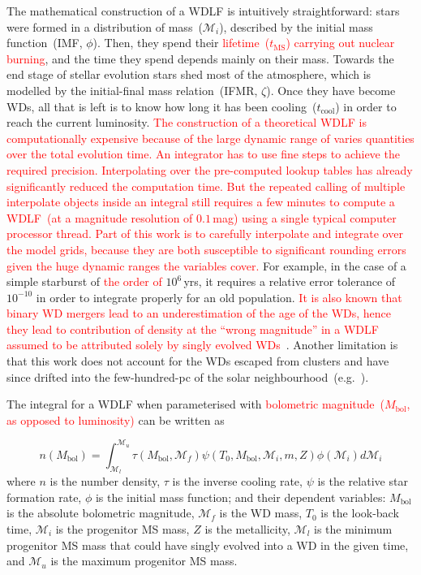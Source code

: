 \documentclass[fleqn,usenatbib]{rasti}
\begin{document}
The mathematical construction of a WDLF is intuitively straightforward: stars
were formed in a distribution of mass~($\mathcal{M}_i$), described by the initial
mass function~(IMF, $\phi$). Then, they spend their \textcolor{red}{lifetime~($t_{\mathrm{MS}}$) carrying out
nuclear burning}, and the time they spend depends mainly on
their mass. Towards the end stage of stellar evolution stars shed most of the
atmosphere, which is modelled by the initial-final mass relation~(IFMR,
$\zeta$). Once they have become WDs, all that is left is to know how long it has
been cooling~($t_{\mathrm{cool}}$) in order to reach the current
luminosity. \textcolor{red}{The construction of a theoretical WDLF is
computationally expensive because of the large dynamic range of varies
quantities over the total evolution time. An integrator has to use fine 
steps to achieve the required precision. Interpolating over the pre-computed
lookup tables has already significantly reduced the computation time. But the
repeated calling of multiple interpolate objects inside an integral still
requires a few minutes to compute a WDLF~(at a magnitude resolution of
$0.1$\,mag) using a single typical computer processor thread. Part of this work
is to carefully interpolate and integrate over the model grids, because they are
both susceptible to significant rounding errors given the huge dynamic ranges
the variables cover.} For example, in the case of a simple starburst of
\textcolor{red}{the order of }$10^6$\,yrs, it requires a relative error
tolerance of $10^{-10}$ in order to integrate properly for an old population.
\textcolor{red}{It is also known that binary WD mergers lead to an underestimation
of the age of the WDs, hence they lead to contribution of density at the
``wrong magnitude'' in a WDLF assumed to be attributed solely by singly evolved
WDs~\citep{2020A&A...636A..31T}}. Another limitation is that this work does not
account for the WDs escaped from clusters and have since drifted into the
few-hundred-pc of the solar neighbourhood~(e.g.\ \citealt{2013ApJ...770..140Z,2022ApJ...926..132H, 2022ApJ...926L..24M}).

The integral for a WDLF when parameterised with \textcolor{red}{bolometric
magnitude~($M_\mathrm{bol}$, as opposed to luminosity)} can be written as

\begin{equation}
    n(M_{\mathrm{bol}}) = \int_{\mathcal{M}_l}^{\mathcal{M}_u}
        \tau(M_\mathrm{bol}, \mathcal{M}_f)
        \psi(T_0, M_\mathrm{bol}, \mathcal{M}_i, m, Z)
        \phi(\mathcal{M}_i) d\mathcal{M}_i
\end{equation}
where $n$ is the number density, $\tau$ is the inverse cooling rate, $\psi$ is
the relative star formation rate, $\phi$ is the initial mass function; and their
dependent variables: $M_\mathrm{bol}$ is the absolute bolometric
magnitude, $\mathcal{M}_f$ is the WD mass, $T_0$ is the look-back time, $\mathcal{M}_i$ is
the progenitor MS mass, $Z$ is the metallicity, $\mathcal{M}_l$ is the minimum
progenitor MS mass that could have singly evolved into a WD in the given time,
and $\mathcal{M}_u$ is the maximum progenitor MS mass.
\end{document}

